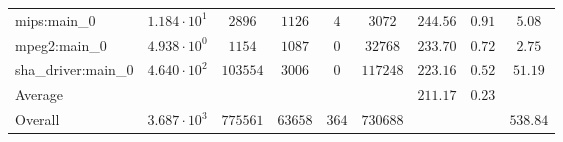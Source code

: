 \begin{tabular}{|l|c|c|c|c|c|c|c|c|}
mips:main\_0            & $ 1.184 \cdot 10^{1}  $ & $ 2896   $ & $ 1126  $ & $ 4   $ & $ 3072   $ & $ 244.56      $ & $ 0.91    $ & $ 5.08    $ \\
mpeg2:main\_0           & $ 4.938 \cdot 10^{0}  $ & $ 1154   $ & $ 1087  $ & $ 0   $ & $ 32768  $ & $ 233.70      $ & $ 0.72    $ & $ 2.75    $ \\
sha\_driver:main\_0     & $ 4.640 \cdot 10^{2}  $ & $ 103554 $ & $ 3006  $ & $ 0   $ & $ 117248 $ & $ 223.16      $ & $ 0.52    $ & $ 51.19   $ \\
\hline
Average                 & $                     $ & $        $ & $       $ & $     $ & $        $ & $ 211.17      $ & $ 0.23    $ & $         $ \\
\hline
Overall                 & $ 3.687 \cdot 10^{3}  $ & $ 775561 $ & $ 63658 $ & $ 364 $ & $ 730688 $ & $             $ & $         $ & $ 538.84  $ \\
\hline
\end{tabular}
